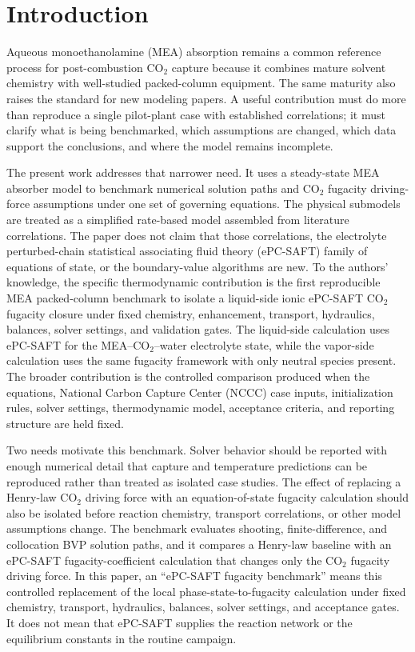     \section{Introduction}\label{sec:introduction}
        Aqueous monoethanolamine (MEA) absorption remains a common reference process for post-combustion CO$_2$ capture because it combines mature solvent chemistry with well-studied packed-column equipment. The same maturity also raises the standard for new modeling papers. A useful contribution must do more than reproduce a single pilot-plant case with established correlations; it must clarify what is being benchmarked, which assumptions are changed, which data support the conclusions, and where the model remains incomplete.

        The present work addresses that narrower need. It uses a steady-state MEA absorber model to benchmark numerical solution paths and CO$_2$ fugacity driving-force assumptions under one set of governing equations. The physical submodels are treated as a simplified rate-based model assembled from literature correlations. The paper does not claim that those correlations, the electrolyte perturbed-chain statistical associating fluid theory (ePC-SAFT) family of equations of state, or the boundary-value algorithms are new. To the authors' knowledge, the specific thermodynamic contribution is the first reproducible MEA packed-column benchmark to isolate a liquid-side ionic ePC-SAFT CO$_2$ fugacity closure under fixed chemistry, enhancement, transport, hydraulics, balances, solver settings, and validation gates. The liquid-side calculation uses ePC-SAFT for the MEA--CO$_2$--water electrolyte state, while the vapor-side calculation uses the same fugacity framework with only neutral species present. The broader contribution is the controlled comparison produced when the equations, National Carbon Capture Center (NCCC) case inputs, initialization rules, solver settings, thermodynamic model, acceptance criteria, and reporting structure are held fixed.

Two needs motivate this benchmark. Solver behavior should be reported with enough numerical detail that capture and temperature predictions can be reproduced rather than treated as isolated case studies. The effect of replacing a Henry-law CO$_2$ driving force with an equation-of-state fugacity calculation should also be isolated before reaction chemistry, transport correlations, or other model assumptions change. The benchmark evaluates shooting, finite-difference, and collocation BVP solution paths, and it compares a Henry-law baseline with an ePC-SAFT fugacity-coefficient calculation that changes only the CO$_2$ fugacity driving force. In this paper, an ``ePC-SAFT fugacity benchmark'' means this controlled replacement of the local phase-state-to-fugacity calculation under fixed chemistry, transport, hydraulics, balances, solver settings, and acceptance gates. It does not mean that ePC-SAFT supplies the reaction network or the equilibrium constants in the routine campaign.

